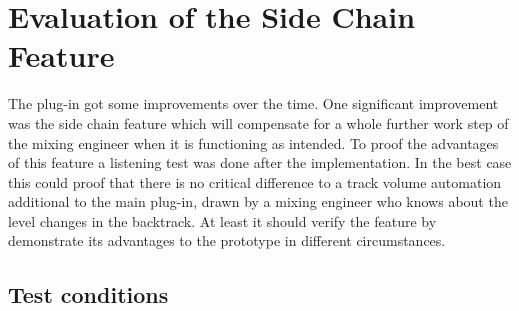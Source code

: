 \chapter{Evaluation of the Side Chain Feature}
\label{chapter:evaluation}

The plug-in got some improvements over the time. One significant improvement was the side chain feature which will compensate for a whole further work step of the mixing engineer when it is functioning as intended. To proof the advantages of this feature a listening test was done after the implementation. In the best case this could proof that there is no critical difference to a track volume automation additional to the main plug-in, drawn by a mixing engineer who knows about the level changes in the backtrack. At least it should verify the feature by demonstrate its advantages to the prototype in different circumstances.\\

\section{Test conditions}